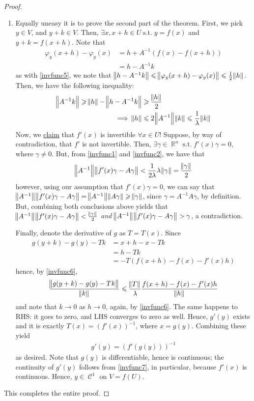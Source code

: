 \documentclass{amsart} %
\theoremstyle{mytheoremstyle}
\theoremstyle{definition}
\numberwithin{equation}{section}
\DeclareMathOperator{\R}{\mathbb{R}}
\DeclareMathOperator{\1}{\mathbbm{1}}
\DeclareMathOperator{\suchthat}{\text{ s.t. }}
\DeclareMathOperator{\contf}{\mathcal{C}}
\renewcommand{\leq}{\leqslant}
\renewcommand{\geq}{\geqslant}
\renewcommand{\leq}{\leqslant}
\renewcommand{\geq}{\geqslant}
\begin{document}
\begin{proof}
\begin{enumerate}[label=(\arabic*)]
		
		\item Equally uneasy it is to prove the second part of the theorem. First, we pick $y \in V$, and $y + k \in V$. Then, $\exists x, x+h \in U \suchthat y=f(x)$ and $ y+k = f(x+h)$. Note that
		\begin{align*}
		\varphi_y (x+h) - \varphi_y (x) &= h + A^{-1} (f(x) - f(x+h)) \\
		&= h - A^{-1} k
		\end{align*}
		as with \eqref{invfunc5}, we note that $\norm{h - A^{-1} k} \leq \norm{\varphi_y (x+h) - \varphi_y (x) } \leq \frac{1}{2} \norm{h}$. Then, we have the following inequality:
		\begin{align}
		\norm{A^{-1} k} \geq \norm{h} - \norm{h - A^{-1} k} &\geq \frac{\norm{h}}{2} \\
		\label{invfunc6}
		\implies \norm{h} &\leq 2 \norm{A^{-1}} \norm{k} \leq \frac{1}{\lambda} \norm{k}
		\end{align}
		Now, we \uline{claim} that $f'(x)$ is invertible $\forall x \in U$! Suppose, by way of contradiction, that $f'$ is not invertible. Then, $\exists \gamma \in \R^n \suchthat f'(x) \gamma = 0$, where $\gamma \neq 0$. But, from \eqref{invfunc1} and \eqref{invfunc2}, we have that
		$$ \norm{A^{-1}} \norm{f'(x)\gamma - A \gamma } < \frac{1}{2\lambda} \lambda \norm{\gamma} = \frac{\norm{\gamma} }{2}   $$
		however, using our assumption that $ f'(x) \gamma = 0$, we can say that $\norm{A^{-1}} \norm{f'(x)\gamma - A \gamma }  = \norm{A^{-1}} \norm{ A \gamma } \geq \norm{\gamma}$, since $\gamma = A^{-1} A \gamma$, by definition. But, combining both conclusions above yields that $\norm{A^{-1}} \norm{f'(x)\gamma - A \gamma } < \frac{\norm{\gamma}}{2}$ \textit{and} $\norm{A^{-1}} \norm{f'(x)\gamma - A \gamma } > \gamma$, a contradiction.
		
		Finally, denote the derivative of $g$ as $T = T(x)$. Since
		\begin{align*}
		g(y+k) - g(y) - Tk &= x+h - x - Tk \\
		&= h - Tk \\
		&= -T (f(x+h) - f(x) - f'(x) h )
		\end{align*}
		hence, by \eqref{invfunc6},
		$$ \frac{\norm{g(y+k) - g(y) - Tk} }{\norm{k} } \leq \frac{\norm{T} }{\lambda} \frac{f(x+h) - f(x) - f'(x) h}{\norm{h} } $$
		and note that $k \to 0$ as $h \to 0$, again, by \eqref{invfunc6}. The same happens to RHS: it goes to zero, and LHS converges to zero as well. Hence, $g'(y)$ exists and it is exactly $T(x) = (f'(x))^{-1}$, where $x =g(y)$. Combining these yield
		\begin{align}
		\label{invfunc7}
		g'(y) = (f'(g(y)))^{-1}
		\end{align}
		as desired. Note that $g(y)$ is differentiable, hence is continuous; the continuity of $g'(y)$ follows from \eqref{invfunc7}, in particular, because $f'(x)$ is continuous. Hence, $y \in \contf^1 $ on $V = f(U)$. 
	\end{enumerate}
	This completes the entire proof.
\end{proof}
\end{document}
